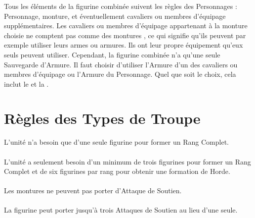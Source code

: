 Tous les éléments de la figurine combinée suivent les règles des Personnages : Personnage, monture, et éventuellement cavaliers ou membres d'équipage supplémentaires. Les cavaliers ou membres d'équipage appartenant à la monture choisie ne comptent pas comme des \og montures \fg{}, ce qui signifie qu'ils peuvent par exemple utiliser leurs armes ou armures. Ils ont leur propre équipement qu'eux seuls peuvent utiliser. Cependant, la figurine combinée n'a qu'une seule Sauvegarde d'Armure. Il faut choisir d'utiliser l'Armure d'un des cavaliers ou membres d'équipage ou l'Armure du Personnage. Quel que soit le choix, cela inclut le \barding{} et la \mountsprotection{}.

\section{Règles des Types de Troupe}

\paragraph{\newfromWHB{\monsterranks}}

L'unité n'a besoin que d'une seule figurine pour former un Rang Complet.

\paragraph{\monstrousranks}

L'unité a seulement besoin d'un minimum de trois figurines pour former un Rang Complet et de six figurines par rang pour obtenir une formation de Horde.

\paragraph{\cavalrysupport}

Les montures ne peuvent pas porter d'Attaque de Soutien.

\paragraph{\monstroussupport}

La figurine peut porter jusqu'à trois Attaques de Soutien au lieu d'une seule.

\newpage
\paragraph{\combinedprofile}

